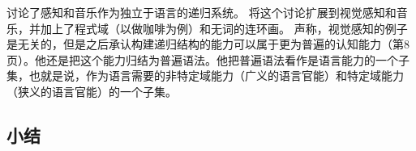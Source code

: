 
 \citet[--114]{CJ2005a}讨论了感知和音乐作为独立于语言的递归系统。 \citet{Jackendoff2011a}将这个讨论扩展到视觉感知和音乐，并加上了程式域（以做咖啡为例）和无词的连环画。 \citet[--8]{Chomsky2007a}声称，视觉感知的例子是无关的，但是之后承认构建递归结构的能力可以属于更为普遍的认知能力（第8页）。他还是把这个能力归结为普遍语法。他把普遍语法看作是语言能力的一个子集，也就是说，作为语言需要的非特定域能力（广义的语言官能）和特定域能力（狭义的语言官能）的一个子集。

\subsection{小结}
\label{Abschnitt-Universalien-Zusammenfassung}

